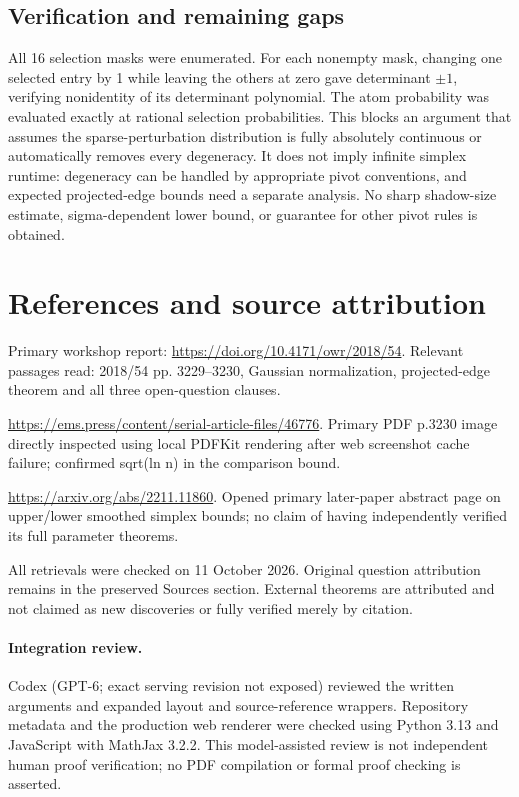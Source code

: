 \documentclass[11pt]{article}
\begin{document}
\subsection{Verification and remaining gaps}
All 16 selection masks were enumerated. For each nonempty mask, changing one selected entry by 1 while leaving the others at zero gave determinant $\pm1$, verifying nonidentity of its determinant polynomial. The atom probability was evaluated exactly at rational selection probabilities. This blocks an argument that assumes the sparse-perturbation distribution is fully absolutely continuous or automatically removes every degeneracy. It does not imply infinite simplex runtime: degeneracy can be handled by appropriate pivot conventions, and expected projected-edge bounds need a separate analysis. No sharp shadow-size estimate, sigma-dependent lower bound, or guarantee for other pivot rules is obtained.

\section{References and source attribution}
Primary workshop report: \url{https://doi.org/10.4171/owr/2018/54}. Relevant passages read: 2018/54 pp. 3229--3230, Gaussian normalization, projected-edge theorem and all three open-question clauses.

\url{https://ems.press/content/serial-article-files/46776}. Primary PDF p.3230 image directly inspected using local PDFKit rendering after web screenshot cache failure; confirmed sqrt(ln n) in the comparison bound.

\url{https://arxiv.org/abs/2211.11860}. Opened primary later-paper abstract page on upper/lower smoothed simplex bounds; no claim of having independently verified its full parameter theorems.

All retrievals were checked on 11 October 2026. Original question attribution remains in the preserved Sources section. External theorems are attributed and not claimed as new discoveries or fully verified merely by citation.


\paragraph{Integration review.} Codex (GPT-6; exact serving revision not exposed) reviewed the written arguments and expanded layout and source-reference wrappers. Repository metadata and the production web renderer were checked using Python 3.13 and JavaScript with MathJax 3.2.2. This model-assisted review is not independent human proof verification; no PDF compilation or formal proof checking is asserted.
\end{document}

